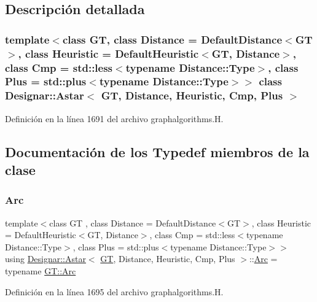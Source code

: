 \subsection{Descripción detallada}
\subsubsection*{template$<$class GT, class Distance = Default\+Distance$<$\+G\+T$>$, class Heuristic = Default\+Heuristic$<$\+G\+T, Distance$>$, class Cmp = std\+::less$<$typename Distance\+::\+Type$>$, class Plus = std\+::plus$<$typename Distance\+::\+Type$>$$>$\newline
class Designar\+::\+Astar$<$ G\+T, Distance, Heuristic, Cmp, Plus $>$}



Definición en la línea 1691 del archivo graphalgorithms.\+H.



\subsection{Documentación de los \textquotesingle{}Typedef\textquotesingle{} miembros de la clase}
\mbox{\label{class_designar_1_1_astar_a4d0b1c7cb0a71b5cfe3d21ea37c12108}} 
\subsubsection{\texorpdfstring{Arc}{Arc}}
{\footnotesize\ttfamily template$<$class GT , class Distance  = Default\+Distance$<$\+G\+T$>$, class Heuristic  = Default\+Heuristic$<$\+G\+T, Distance$>$, class Cmp  = std\+::less$<$typename Distance\+::\+Type$>$, class Plus  = std\+::plus$<$typename Distance\+::\+Type$>$$>$ \\
using \hyperlink{class_designar_1_1_astar}{Designar\+::\+Astar}$<$ \hyperlink{demo-buildgraph_8_c_a3001c40d2c31ca87ed96cd7d1334a55e}{GT}, Distance, Heuristic, Cmp, Plus $>$\+::\hyperlink{class_designar_1_1_astar_a4d0b1c7cb0a71b5cfe3d21ea37c12108}{Arc} =  typename \hyperlink{class_designar_1_1_graph_a74c730ef4ce2d20f998d72bd25c2b5bf}{G\+T\+::\+Arc}}



Definición en la línea 1695 del archivo graphalgorithms.\+H.

\mbox{\label{class_designar_1_1_astar_a0d4cdf6b94255824c6c93e5ae18e9eb7}} 
